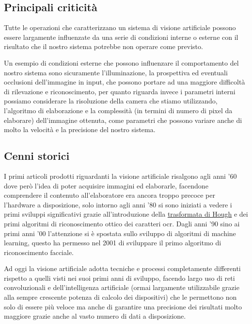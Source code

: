 \documentclass[12pt,a4paper,openright,twoside]{book}
\begin{document}
\subsection{Principali criticità}
Tutte le operazioni che caratterizzano un sistema di visione artificiale possono essere largamente influenzate da una serie di condizioni interne o esterne con il risultato che il nostro sistema potrebbe non operare come previsto.

Un esempio di condizioni esterne che possono influenzare il comportamento del nostro sistema sono sicuramente l'illuminazione, la prospettiva ed eventuali occlusioni dell'immagine in input, che possono portare ad una maggiore difficoltà di rilevazione e riconoscimento, per quanto riguarda invece i parametri interni possiamo considerare la risoluzione della camera che stiamo utilizzando, l'algoritmo di elaborazione e la complessità (in termini di numero di pixel da elaborare) dell'immagine ottenuta, come parametri che possono variare anche di molto la velocità e la precisione del nostro sistema.

\subsection{Cenni storici}
I primi articoli prodotti riguardanti la visione artificiale risalgono agli anni '60 dove però l'idea di poter acquisire immagini ed elaborarle, facendone comprendere il contenuto all'elaboratore era ancora troppo precoce per l'hardware a disposizione,
solo intorno agli anni '80 si sono iniziati a vedere i primi sviluppi significativi grazie all'introduzione della \href{https://en.wikipedia.org/wiki/Hough_transform}{trasformata di Hough}
e dei primi algoritmi di riconoscimento ottico dei caratteri \acrfull{ocr}.
Dagli anni '90 sino ai primi anni '00 l'attenzione si è spostata sullo sviluppo di algoritmi di machine learning, questo ha permesso nel 2001 di sviluppare il primo algoritmo di riconoscimento facciale.\cite{artificialVisionHistory}

Ad oggi la visione artificiale adotta tecniche e processi completamente differenti rispetto a quelli visti nei suoi primi anni di sviluppo, facendo largo uso di reti convoluzionali e dell'intelligenza artificiale (ormai largamente utilizzabile grazie alla sempre crescente potenza di calcolo dei dispositivi) che le permettono non solo di essere più veloce ma anche di garantire una precisione dei risultati molto maggiore grazie anche al vasto numero di dati a disposizione.
\end{document}
